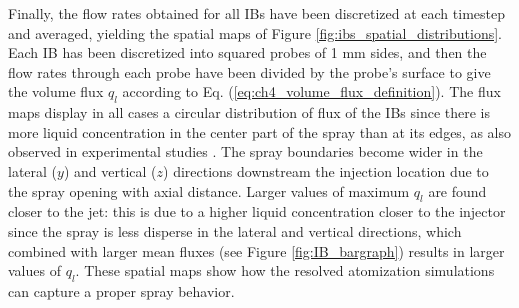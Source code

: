 Finally, the flow rates obtained for all IBs have been discretized at each timestep and averaged, yielding the spatial maps of Figure \ref{fig:ibs_spatial_distributions}. Each IB has been discretized into squared probes of 1 mm sides, and then the flow rates through each probe have been divided by the probe's surface to give the volume flux $q_l$ according to Eq. (\ref{eq:ch4_volume_flux_definition}). The flux maps display in all cases a circular distribution of flux of the IBs since there is more liquid concentration in the center part of the spray than at its edges, as also observed in experimental studies .  The spray boundaries become wider in the lateral ($y$) and vertical ($z$) directions downstream the injection location due to the spray opening with axial distance. Larger values of maximum $q_l$ are found closer to the jet: this is due to a higher liquid concentration closer to the injector since the spray is less disperse in the lateral and vertical directions, which combined with larger mean fluxes (see Figure \ref{fig:IB_bargraph}) results in larger values of $q_l$. These spatial maps show how the resolved atomization simulations can capture a proper spray behavior.



\clearpage

